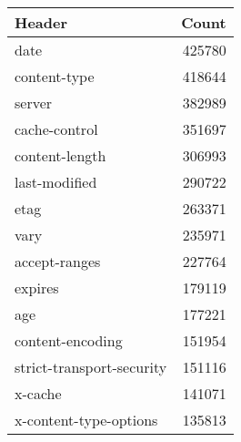 \begin{tabular}{lr}
\toprule
                   Header &  Count \\
\midrule
                     date & 425780 \\
             content-type & 418644 \\
                   server & 382989 \\
            cache-control & 351697 \\
           content-length & 306993 \\
            last-modified & 290722 \\
                     etag & 263371 \\
                     vary & 235971 \\
            accept-ranges & 227764 \\
                  expires & 179119 \\
                      age & 177221 \\
         content-encoding & 151954 \\
strict-transport-security & 151116 \\
                  x-cache & 141071 \\
   x-content-type-options & 135813 \\
\bottomrule
\end{tabular}
